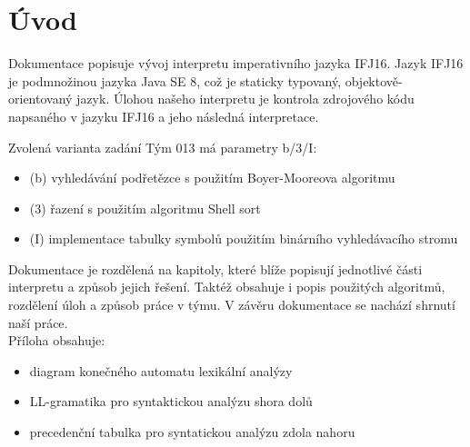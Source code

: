 \documentclass[a4paper, 11pt]{article}
\begin{document}
    \section{Úvod}
    \par
    Dokumentace popisuje vývoj interpretu imperativního jazyka IFJ16. Jazyk IFJ16 je podmnožinou jazyka Java SE 8, což je staticky typovaný, objektově-orientovaný jazyk.
    Úlohou našeho interpretu je kontrola zdrojového kódu napsaného v jazyku IFJ16 a jeho následná interpretace.\par
    Zvolená varianta zadání Tým 013 má parametry b/3/I:
    \begin{itemize}[itemsep=1mm]
        \item(b) vyhledávání podřetězce s použitím Boyer-Mooreova algoritmu
        \item(3) řazení s použitím algoritmu Shell sort
        \item(I) implementace tabulky symbolů použitím binárního vyhledávacího stromu
    \end{itemize}
    Dokumentace je rozdělená na kapitoly, které blíže popisují jednotlivé části interpretu a způsob jejich řešení. Taktéž obsahuje i popis použitých algoritmů, rozdělení úloh a způsob práce v týmu. V závěru dokumentace se nachází shrnutí naší práce.\\
    Příloha obsahuje:
    \begin{itemize}[itemsep=1mm]
        \item diagram konečného automatu lexikální analýzy
        \item LL-gramatika pro syntaktickou analýzu shora dolů
        \item precedenční tabulka pro syntatickou analýzu zdola nahoru
    \end{itemize}
    
\end{document}
